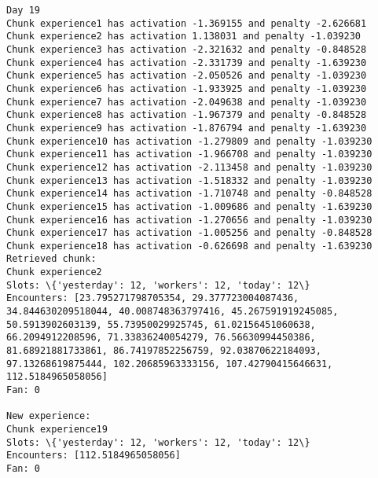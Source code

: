 \documentclass[11pt]{article}
\begin{document}
\begin{Verbatim}[commandchars=\\\{\}]
Day 19
Chunk experience1 has activation -1.369155 and penalty -2.626681
Chunk experience2 has activation 1.138031 and penalty -1.039230
Chunk experience3 has activation -2.321632 and penalty -0.848528
Chunk experience4 has activation -2.331739 and penalty -1.639230
Chunk experience5 has activation -2.050526 and penalty -1.039230
Chunk experience6 has activation -1.933925 and penalty -1.039230
Chunk experience7 has activation -2.049638 and penalty -1.039230
Chunk experience8 has activation -1.967379 and penalty -0.848528
Chunk experience9 has activation -1.876794 and penalty -1.639230
Chunk experience10 has activation -1.279809 and penalty -1.039230
Chunk experience11 has activation -1.966708 and penalty -1.039230
Chunk experience12 has activation -2.113458 and penalty -1.039230
Chunk experience13 has activation -1.518332 and penalty -1.039230
Chunk experience14 has activation -1.710748 and penalty -0.848528
Chunk experience15 has activation -1.009686 and penalty -1.639230
Chunk experience16 has activation -1.270656 and penalty -1.039230
Chunk experience17 has activation -1.005256 and penalty -0.848528
Chunk experience18 has activation -0.626698 and penalty -1.639230
Retrieved chunk:
Chunk experience2
Slots: \{'yesterday': 12, 'workers': 12, 'today': 12\}
Encounters: [23.795271798705354, 29.377723004087436, 34.844630209518044, 40.008748363797416, 45.267591919245085, 50.5913902603139, 55.73950029925745, 61.02156451060638, 66.2094912208596, 71.33836240054279, 76.56630994450386, 81.68921881733861, 86.74197852256759, 92.03870622184093, 97.13268619875444, 102.20685963333156, 107.42790415646631, 112.5184965058056]
Fan: 0

New experience:
Chunk experience19
Slots: \{'yesterday': 12, 'workers': 12, 'today': 12\}
Encounters: [112.5184965058056]
Fan: 0


\end{Verbatim}
\end{document}
